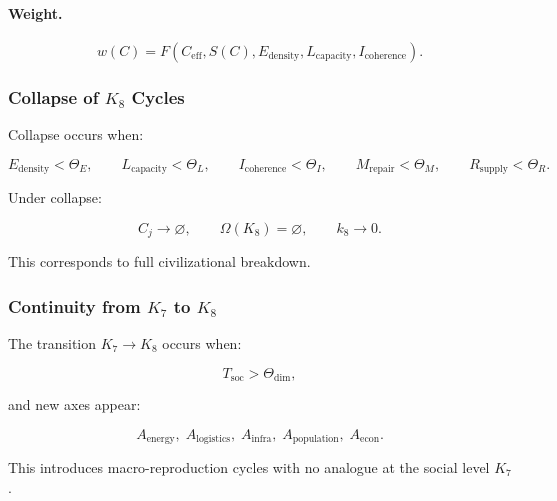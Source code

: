 \paragraph{Weight.}
\[
 w(C)
 =
 F(C_{\mathrm{eff}},
   S(C),
   E_{\mathrm{density}},
   L_{\mathrm{capacity}},
   I_{\mathrm{coherence}}).
\]

\subsubsection{Collapse of \texorpdfstring{$K_8$}{K_8} Cycles}

Collapse occurs when:

\[
  E_{\mathrm{density}} < \Theta_E,\qquad
  L_{\mathrm{capacity}} < \Theta_L,\qquad
  I_{\mathrm{coherence}} < \Theta_I,\qquad
  M_{\mathrm{repair}} < \Theta_M,\qquad
  R_{\mathrm{supply}} < \Theta_R.
\]

Under collapse:

\[
  C_j \to \varnothing,\qquad
  \Omega(K_8)=\varnothing,\qquad
  k_8\to 0.
\]

This corresponds to full civilizational breakdown.

\subsubsection{Continuity from \texorpdfstring{$K_7$}{K_7} to \texorpdfstring{$K_8$}{K_8}}

The transition $K_7\to K_8$ occurs when:

\[
  T_{\mathrm{soc}} > \Theta_{\mathrm{dim}},
\]

and new axes appear:

\[
  A_{\mathrm{energy}},\;
  A_{\mathrm{logistics}},\;
  A_{\mathrm{infra}},\;
  A_{\mathrm{population}},\;
  A_{\mathrm{econ}}.
\]

This introduces macro-reproduction cycles with no analogue at the social level
$K_7$.
